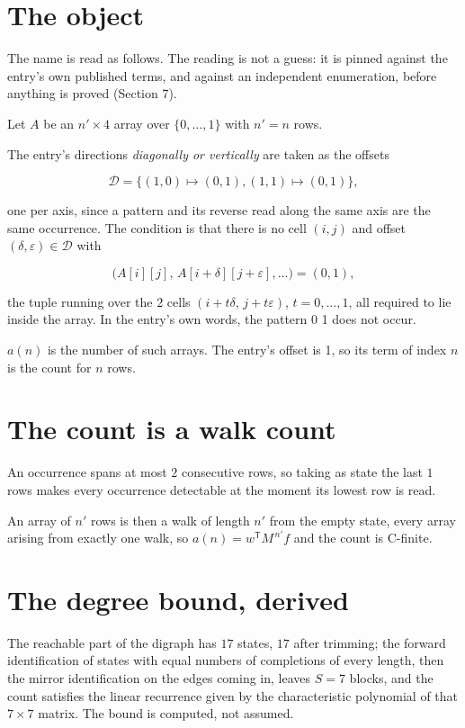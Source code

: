 \documentclass[11pt]{article}
\theoremstyle{definition}
\begin{document}
\section{The object}

The name is read as follows. The reading is not a guess: it is pinned against the entry's own published terms, and against an independent enumeration, before anything is proved (Section 7).

Let $A$ be an $n' \times 4$ array over $\{0,\dots,1\}$ with $n' = n$ rows.

The entry's directions {\itshape diagonally or vertically} are taken as the offsets

\[\mathcal{D} = \{(1,0)\mapsto(0,1), (1,1)\mapsto(0,1)\},\]

one per axis, since a pattern and its reverse read along the same axis are the same occurrence. The condition is that there is no cell $(i,j)$ and offset $(\delta,\varepsilon)\in\mathcal{D}$ with

\[\bigl(A[i][j],\,A[i{+}\delta][j{+}\varepsilon],\dots\bigr) = (0, 1),\]

the tuple running over the $2$ cells $(i+t\delta,\,j+t\varepsilon)$, $t = 0,\dots,1$, all required to lie inside the array. In the entry's own words, the pattern 0 1 does not occur.

$a(n)$ is the number of such arrays. The entry's offset is 1, so its term of index $n$ is the count for $n$ rows.

\section{The count is a walk count}

An occurrence spans at most $2$ consecutive rows, so taking as state the last $1$ rows makes every occurrence detectable at the moment its lowest row is read.

An array of $n'$ rows is then a walk of length $n'$ from the empty state, every array arising from exactly one walk, so $a(n) = w^{\mathsf T}M^{\,n'}f$ and the count is C-finite.

\section{The degree bound, derived}

The reachable part of the digraph has $17$ states, $17$ after trimming; the forward identification of states with equal numbers of completions of every length, then the mirror identification on the edges coming in, leaves $S = 7$ blocks, and the count satisfies the linear recurrence given by the characteristic polynomial of that $7\times7$ matrix. The bound is computed, not assumed.
\end{document}
